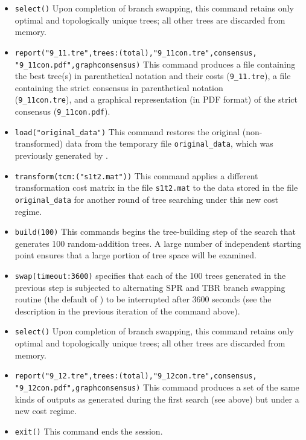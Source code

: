 \begin{itemize}
\item \texttt{select()} Upon completion of branch swapping, this command retains only optimal and topologically 
unique trees; all other trees are discarded from memory.
\item \texttt{report("9\_11.tre",trees:(total),"9\_11con.tre",consensus,\\"9\_11con.pdf",graphconsensus)} This command 
produces a file containing the best tree(s) in parenthetical notation and their costs (\texttt{9\_11.tre}), a file containing the 
strict consensus in parenthetical notation \\(\texttt{9\_11con.tre}), and a graphical representation (in PDF format) of the 
strict consensus (\texttt{9\_11con.pdf}).
\item \texttt{load("original\_data")} This command restores the original (non-trans\-formed) data from the temporary file 
\texttt{original\_data}, which was previously generated by .
\item \texttt{transform(tcm:("s1t2.mat"))} This command applies a different transformation cost matrix in the file 
\texttt{s1t2.mat} to the data stored in the file \texttt{original\_data} for another round of tree searching under this new 
cost regime.
\item \texttt{build(100)} This commands begins the tree-building step of the search that generates 100 random-addition 
trees. A large number of independent starting point ensures that a large portion of tree space will be 
examined.
\item \texttt{swap(timeout:3600)}  specifies that each of the 100 trees generated in the previous step is 
subjected to alternating SPR and TBR branch swapping routine (the default of \poy) to be interrupted after 3600 
seconds (see the description in the previous iteration of the command above).
\item \texttt{select()} Upon completion of branch swapping, this command retains only optimal and topologically 
unique trees; all other trees are discarded from memory.
\item \texttt{report("9\_12.tre",trees:(total),"9\_12con.tre",consensus,\\"9\_12con.pdf",graphconsensus)} This command 
produces a set of the same kinds of outputs as generated during the first search (see above) but under a new cost 
regime.
\item \texttt{exit()} This command ends the \poy session.
\end{itemize}

